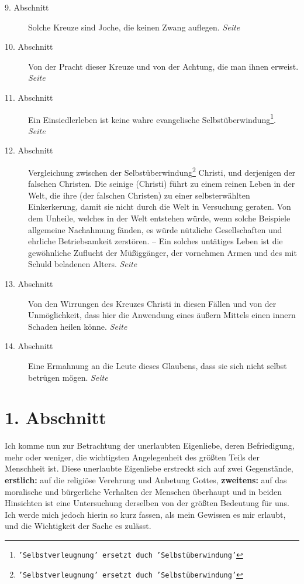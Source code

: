 \begin{description}
\item[9. Abschnitt] Solche Kreuze sind Joche, die keinen Zwang auflegen.
\dotfill \textit{Seite~\pageref{kap5_ab9}}\\
\item[10. Abschnitt] Von der Pracht dieser Kreuze und von der Achtung, die man
ihnen erweist.
\dotfill \textit{Seite~\pageref{kap5_ab10}}\\
\item[11. Abschnitt] Ein Einsiedlerleben ist keine wahre evangelische
Selbstüberwindung\footnote{\texttt{'Selbstverleugnung' ersetzt duch
'Selbstüberwindung'}}.
\dotfill \textit{Seite~\pageref{kap5_ab11}}\\
\item[12. Abschnitt] Vergleichung zwischen der
Selbstüberwindung\footnote{\texttt{'Selbstverleugnung' ersetzt duch
'Selbstüberwindung'}} Christi, und
derjenigen der falschen Christen. Die seinige (Christi) führt zu einem reinen
Leben in
der Welt, die ihre (der falschen Christen) zu einer selbsterwählten
Einkerkerung, damit sie nicht
durch die Welt in Versuchung geraten. Von dem Unheile, welches in der Welt
entstehen würde, wenn solche Beispiele allgemeine Nachahmung fänden, es würde
nützliche Gesellschaften und ehrliche Betriebsamkeit zerstören. -- Ein solches
untätiges Leben ist die gewöhnliche Zuflucht der Müßiggänger, der vornehmen
Armen und des mit Schuld beladenen Alters.
\dotfill \textit{Seite~\pageref{kap5_ab12}}\\
\item[13. Abschnitt] Von den Wirrungen des Kreuzes Christi in diesen Fällen und
von der Unmöglichkeit, dass hier die Anwendung eines äußern Mittels einen innern
Schaden heilen könne.
\dotfill \textit{Seite~\pageref{kap5_ab13}}\\
\item[14. Abschnitt] Eine Ermahnung an die Leute dieses Glaubens, dass sie sich
nicht selbst betrügen mögen.
\dotfill \textit{Seite~\pageref{kap5_ab14}}\\

\end{description}

\newpage

\section{1. Abschnitt} \label{kap5_ab1}

Ich komme nun zur Betrachtung der unerlaubten Eigenliebe, deren Befriedigung,
mehr oder weniger, die wichtigsten Angelegenheit des größten Teils der
Menschheit ist. Diese unerlaubte Eigenliebe erstreckt sich auf zwei Gegenstände,
\textbf{erstlich:} auf die religiöse Verehrung und Anbetung Gottes,
\textbf{zweitens:} auf das
moralische und bürgerliche Verhalten der Menschen überhaupt und in beiden
Hinsichten ist eine Untersuchung derselben von der größten Bedeutung für uns.
Ich werde mich jedoch hierin so kurz fassen, als mein Gewissen es mir erlaubt,
und die Wichtigkeit der Sache es zulässt.

